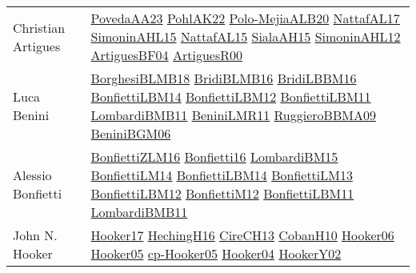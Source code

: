{\begin{longtable}{p{4cm}p{20cm}}
Christian Artigues & \href{papers/PovedaAA23.pdf}{PovedaAA23}\cite{PovedaAA23} \href{articles/PohlAK22.pdf}{PohlAK22}\cite{PohlAK22} \href{}{Polo-MejiaALB20}\cite{Polo-MejiaALB20} \href{articles/NattafAL17.pdf}{NattafAL17}\cite{NattafAL17} \href{articles/SimoninAHL15.pdf}{SimoninAHL15}\cite{SimoninAHL15} \href{articles/NattafAL15.pdf}{NattafAL15}\cite{NattafAL15} \href{papers/SialaAH15.pdf}{SialaAH15}\cite{SialaAH15} \href{papers/SimoninAHL12.pdf}{SimoninAHL12}\cite{SimoninAHL12} \href{papers/ArtiguesBF04.pdf}{ArtiguesBF04}\cite{ArtiguesBF04} \href{articles/ArtiguesR00.pdf}{ArtiguesR00}\cite{ArtiguesR00} \\
Luca Benini & \href{articles/BorghesiBLMB18.pdf}{BorghesiBLMB18}\cite{BorghesiBLMB18} \href{articles/BridiBLMB16.pdf}{BridiBLMB16}\cite{BridiBLMB16} \href{papers/BridiLBBM16.pdf}{BridiLBBM16}\cite{BridiLBBM16} \href{articles/BonfiettiLBM14.pdf}{BonfiettiLBM14}\cite{BonfiettiLBM14} \href{papers/BonfiettiLBM12.pdf}{BonfiettiLBM12}\cite{BonfiettiLBM12} \href{papers/BonfiettiLBM11.pdf}{BonfiettiLBM11}\cite{BonfiettiLBM11} \href{papers/LombardiBMB11.pdf}{LombardiBMB11}\cite{LombardiBMB11} \href{articles/BeniniLMR11.pdf}{BeniniLMR11}\cite{BeniniLMR11} \href{articles/RuggieroBBMA09.pdf}{RuggieroBBMA09}\cite{RuggieroBBMA09} \href{papers/BeniniBGM06.pdf}{BeniniBGM06}\cite{BeniniBGM06} \\
Alessio Bonfietti & \href{papers/BonfiettiZLM16.pdf}{BonfiettiZLM16}\cite{BonfiettiZLM16} \href{}{Bonfietti16}\cite{Bonfietti16} \href{papers/LombardiBM15.pdf}{LombardiBM15}\cite{LombardiBM15} \href{papers/BonfiettiLM14.pdf}{BonfiettiLM14}\cite{BonfiettiLM14} \href{articles/BonfiettiLBM14.pdf}{BonfiettiLBM14}\cite{BonfiettiLBM14} \href{papers/BonfiettiLM13.pdf}{BonfiettiLM13}\cite{BonfiettiLM13} \href{papers/BonfiettiLBM12.pdf}{BonfiettiLBM12}\cite{BonfiettiLBM12} \href{papers/BonfiettiM12.pdf}{BonfiettiM12}\cite{BonfiettiM12} \href{papers/BonfiettiLBM11.pdf}{BonfiettiLBM11}\cite{BonfiettiLBM11} \href{papers/LombardiBMB11.pdf}{LombardiBMB11}\cite{LombardiBMB11} \\
John N. Hooker & \href{papers/Hooker17.pdf}{Hooker17}\cite{Hooker17} \href{papers/HechingH16.pdf}{HechingH16}\cite{HechingH16} \href{papers/CireCH13.pdf}{CireCH13}\cite{CireCH13} \href{papers/CobanH10.pdf}{CobanH10}\cite{CobanH10} \href{articles/Hooker06.pdf}{Hooker06}\cite{Hooker06} \href{articles/Hooker05.pdf}{Hooker05}\cite{Hooker05} \href{papers/cp-Hooker05.pdf}{cp-Hooker05}\cite{cp-Hooker05} \href{papers/Hooker04.pdf}{Hooker04}\cite{Hooker04} \href{papers/HookerY02.pdf}{HookerY02}\cite{HookerY02} \\

\end{longtable}}
